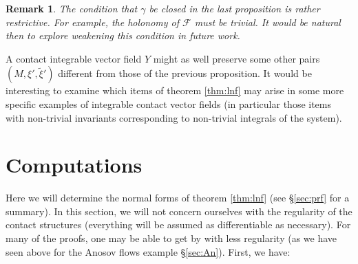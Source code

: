 \documentclass[10pt]{amsart}
\theoremstyle{definition}
\newtheorem{rem}{Remark}
\begin{document}
\begin{rem}
   {\em The condition that $\gamma$ be closed in the last proposition is rather restrictive. For example, the holonomy of $\mathcal{F}$ must be trivial. It would be natural then to explore weakening this condition in future work.}
\end{rem}

A contact integrable vector field $Y$ might as well preserve some other pairs $(M, \xi', \tilde \xi')$ different from those of the previous proposition. It would be interesting to examine which items of theorem \ref{thm:lnf} may arise in some more specific examples of integrable contact vector fields (in particular those items with non-trivial invariants corresponding to non-trivial integrals of the system). 


\section{Computations}\label{sec:Comps}

Here we will determine the normal forms of theorem \ref{thm:lnf} (see \S \ref{sec:prf} for a summary). In this section, we will not concern ourselves with the regularity of the contact structures (everything will be assumed as differentiable as necessary). For many of the proofs, one may be able to get by with less regularity (as we have seen above for the Anosov flows example \S \ref{sec:An}).  First, we have:
\end{document}
